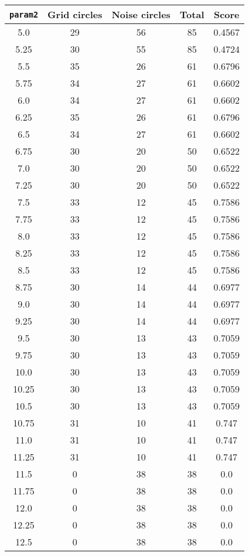 \documentclass[letterpaper, 12pt]{article}
\begin{document}
\begin{longtable}{|c|c|c|c|c|}
\hline
\textbf{\texttt{param2}} & \textbf{Grid circles} & \textbf{Noise circles} & \textbf{Total} & \textbf{Score} \\
\hline
5.0 & 29 & 56 & 85 & 0.4567 \\
\hline
5.25 & 30 & 55 & 85 & 0.4724 \\
\hline
5.5 & 35 & 26 & 61 & 0.6796 \\
\hline
5.75 & 34 & 27 & 61 & 0.6602 \\
\hline
6.0 & 34 & 27 & 61 & 0.6602 \\
\hline
6.25 & 35 & 26 & 61 & 0.6796 \\
\hline
6.5 & 34 & 27 & 61 & 0.6602 \\
\hline
6.75 & 30 & 20 & 50 & 0.6522 \\
\hline
7.0 & 30 & 20 & 50 & 0.6522 \\
\hline
7.25 & 30 & 20 & 50 & 0.6522 \\
\hline
7.5 & 33 & 12 & 45 & 0.7586 \\
\hline
7.75 & 33 & 12 & 45 & 0.7586 \\
\hline
8.0 & 33 & 12 & 45 & 0.7586 \\
\hline
8.25 & 33 & 12 & 45 & 0.7586 \\
\hline
8.5 & 33 & 12 & 45 & 0.7586 \\
\hline
8.75 & 30 & 14 & 44 & 0.6977 \\
\hline
9.0 & 30 & 14 & 44 & 0.6977 \\
\hline
9.25 & 30 & 14 & 44 & 0.6977 \\
\hline
9.5 & 30 & 13 & 43 & 0.7059 \\
\hline
9.75 & 30 & 13 & 43 & 0.7059 \\
\hline
10.0 & 30 & 13 & 43 & 0.7059 \\
\hline
10.25 & 30 & 13 & 43 & 0.7059 \\
\hline
10.5 & 30 & 13 & 43 & 0.7059 \\
\hline
10.75 & 31 & 10 & 41 & 0.747 \\
\hline
11.0 & 31 & 10 & 41 & 0.747 \\
\hline
11.25 & 31 & 10 & 41 & 0.747 \\
\hline
11.5 & 0 & 38 & 38 & 0.0 \\
\hline
11.75 & 0 & 38 & 38 & 0.0 \\
\hline
12.0 & 0 & 38 & 38 & 0.0 \\
\hline
12.25 & 0 & 38 & 38 & 0.0 \\
\hline
12.5 & 0 & 38 & 38 & 0.0 \\

\end{longtable}
\end{document}
